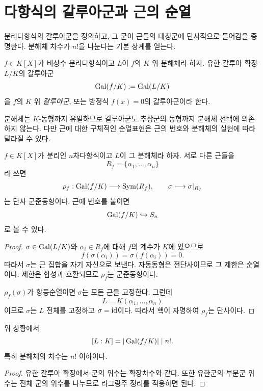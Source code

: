 \clearpage
\section{다항식의 갈루아군과 근의 순열}
\label{sec:equation-galois-group-definition}

\begin{learninggoal}
분리다항식의 갈루아군을 정의하고, 그 군이 근들의 대칭군에 단사적으로 들어감을 증명한다. 분해체 차수가 $n!$을 나눈다는 기본 상계를 얻는다.
\end{learninggoal}

\begin{definition}
$f\in K[X]$가 비상수 분리다항식이고 $L$이 $f$의 $K$ 위 분해체라 하자. 유한 갈루아 확장 $L/K$의 갈루아군
\[
  \operatorname{Gal}(f/K):=\operatorname{Gal}(L/K)
\]
을 $f$의 $K$ 위 \emph{갈루아군}, 또는 방정식 $f(x)=0$의 갈루아군이라 한다.
\end{definition}

분해체는 $K$-동형까지 유일하므로 갈루아군도 추상군의 동형까지 분해체 선택에 의존하지 않는다. 다만 근에 대한 구체적인 순열표현은 근의 번호와 분해체의 실현에 따라 달라질 수 있다.

\begin{theorem}[근 순열 표현]
$f\in K[X]$가 분리인 $n$차다항식이고 $L$이 그 분해체라 하자. 서로 다른 근들을
\[
  R_f=\{\alpha_1,\dots,\alpha_n\}
\]
라 쓰면
\[
  \rho_f:\operatorname{Gal}(f/K)\longrightarrow\operatorname{Sym}(R_f),
  \qquad
  \sigma\longmapsto\sigma|_{R_f}
\]
는 단사 군준동형이다. 근에 번호를 붙이면
\[
  \operatorname{Gal}(f/K)\hookrightarrow S_n
\]
로 볼 수 있다.
\end{theorem}

\begin{proof}
$\sigma\in\operatorname{Gal}(L/K)$와 $\alpha_i\in R_f$에 대해 $f$의 계수가 $K$에 있으므로
\[
  f(\sigma(\alpha_i))
  =\sigma(f(\alpha_i))=0.
\]
따라서 $\sigma$는 근 집합을 자기 자신으로 보낸다. 자동동형은 전단사이므로 그 제한은 순열이다. 제한은 합성과 호환되므로 $\rho_f$는 군준동형이다.

$\rho_f(\sigma)$가 항등순열이면 $\sigma$는 모든 근을 고정한다. 그런데
\[
  L=K(\alpha_1,\dots,\alpha_n)
\]
이므로 $\sigma$는 $L$ 전체를 고정하고 $\sigma=\operatorname{id}$이다. 따라서 핵이 자명하여 $\rho_f$는 단사이다.
\end{proof}

\begin{corollary}
위 상황에서
\[
  [L:K]=|\operatorname{Gal}(f/K)|\mid n!.
\]
특히 분해체의 차수는 $n!$ 이하이다.
\end{corollary}

\begin{proof}
유한 갈루아 확장에서 군의 위수는 확장차수와 같다. 또한 유한군의 부분군 위수는 전체 군의 위수를 나누므로 라그랑주 정리를 적용하면 된다.
\end{proof}

